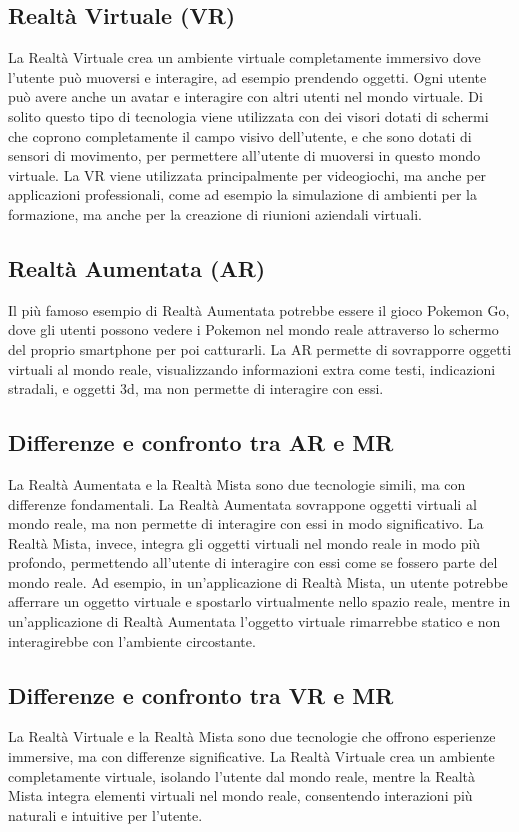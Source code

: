 \subsection{Realtà Virtuale (VR) }
La Realtà Virtuale crea un ambiente virtuale completamente immersivo dove l'utente può muoversi e interagire, ad esempio prendendo oggetti. Ogni utente può avere anche un avatar e interagire con altri utenti nel mondo virtuale. Di solito questo tipo di tecnologia viene utilizzata con dei visori dotati di schermi che coprono completamente il campo visivo dell'utente, e che sono dotati di sensori di movimento, per permettere all'utente di muoversi in questo mondo virtuale. La VR viene utilizzata principalmente per videogiochi, ma anche per applicazioni professionali, come ad esempio la simulazione di ambienti per la formazione, ma anche per la creazione di riunioni aziendali virtuali.

\subsection{Realtà Aumentata (AR) }
Il più famoso esempio di Realtà Aumentata potrebbe essere il gioco Pokemon Go, dove gli utenti possono vedere i Pokemon nel mondo reale attraverso lo schermo del proprio smartphone per poi catturarli. La AR permette di sovrapporre oggetti virtuali al mondo reale, visualizzando informazioni extra come testi, indicazioni stradali, e oggetti 3d, ma non permette di interagire con essi.

\subsection{Differenze e confronto tra AR e MR}
La Realtà Aumentata e la Realtà Mista sono due tecnologie simili, ma con differenze fondamentali. La Realtà Aumentata sovrappone oggetti virtuali al mondo reale, ma non permette di interagire con essi in modo significativo. La Realtà Mista, invece, integra gli oggetti virtuali nel mondo reale in modo più profondo, permettendo all'utente di interagire con essi come se fossero parte del mondo reale. Ad esempio, in un'applicazione di Realtà Mista, un utente potrebbe afferrare un oggetto virtuale e spostarlo virtualmente nello spazio reale, mentre in un'applicazione di Realtà Aumentata l'oggetto virtuale rimarrebbe statico e non interagirebbe con l'ambiente circostante.

\subsection{Differenze e confronto tra VR e MR}
La Realtà Virtuale e la Realtà Mista sono due tecnologie che offrono esperienze immersive, ma con differenze significative. La Realtà Virtuale crea un ambiente completamente virtuale, isolando l'utente dal mondo reale, mentre la Realtà Mista integra elementi virtuali nel mondo reale, consentendo interazioni più naturali e intuitive per l'utente.

\cite{DifferenceMeta-AR-VR-MR} \cite{DifferenceIBM-AR-VR-MR}